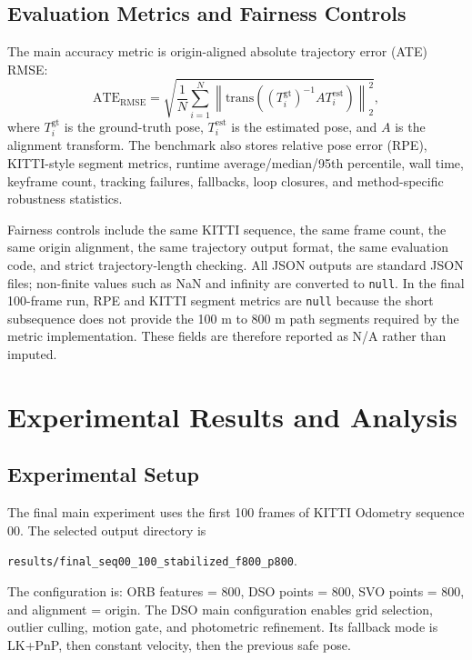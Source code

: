 \documentclass[11pt,a4paper]{article}
\newcommand{\NA}{\textsc{N/A}}
\begin{document}
\subsection{Evaluation Metrics and Fairness Controls}

The main accuracy metric is origin-aligned absolute trajectory error (ATE) RMSE:
\begin{equation}
  \mathrm{ATE}_{\mathrm{RMSE}} = \sqrt{\frac{1}{N}\sum_{i=1}^{N}\left\|\mathrm{trans}\left((T_i^{\mathrm{gt}})^{-1}AT_i^{\mathrm{est}}\right)\right\|_2^2},
\end{equation}
where $T_i^{\mathrm{gt}}$ is the ground-truth pose, $T_i^{\mathrm{est}}$ is the estimated pose, and $A$ is the alignment transform. The benchmark also stores relative pose error (RPE), KITTI-style segment metrics, runtime average/median/95th percentile, wall time, keyframe count, tracking failures, fallbacks, loop closures, and method-specific robustness statistics.

Fairness controls include the same KITTI sequence, the same frame count, the same origin alignment, the same trajectory output format, the same evaluation code, and strict trajectory-length checking. All JSON outputs are standard JSON files; non-finite values such as NaN and infinity are converted to \texttt{null}. In the final 100-frame run, RPE and KITTI segment metrics are \texttt{null} because the short subsequence does not provide the 100 m to 800 m path segments required by the metric implementation. These fields are therefore reported as \NA{} rather than imputed.

\section{Experimental Results and Analysis}

\subsection{Experimental Setup}

The final main experiment uses the first 100 frames of KITTI Odometry sequence 00. The selected output directory is
\begin{center}
\texttt{results/final\_seq00\_100\_stabilized\_f800\_p800}.
\end{center}
The configuration is: ORB features = 800, DSO points = 800, SVO points = 800, and alignment = origin. The DSO main configuration enables grid selection, outlier culling, motion gate, and photometric refinement. Its fallback mode is LK+PnP, then constant velocity, then the previous safe pose.
\end{document}
